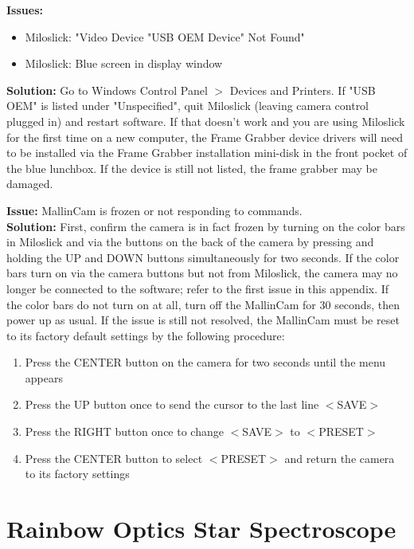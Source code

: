 \documentclass[12pt,titlepage]{article}
\begin{document}
\textbf{\flushleft Issues:}
\begin{itemize}
	\item Miloslick: "Video Device "USB OEM Device" Not Found"
	\item Miloslick: Blue screen in display window
\end{itemize}
\textbf{Solution:} Go to Windows Control Panel $>$ Devices and Printers.
If "USB OEM" is listed under "Unspecified", quit Miloslick (leaving camera control plugged in) and restart software.
If that doesn't work and you are using Miloslick for the first time on a new computer, the Frame Grabber device drivers will need to be installed via the Frame Grabber installation mini-disk in the front pocket of the blue lunchbox. If the device is still not listed, the frame grabber may be damaged.

\textbf{\flushleft Issue:} MallinCam is frozen or not responding to commands.\\
\textbf{Solution:} First, confirm the camera is in fact frozen by turning on the color bars in Miloslick and via the buttons on the back of the camera by pressing and holding the UP and DOWN buttons simultaneously for two seconds. If the color bars turn on via the camera buttons but not from Miloslick, the camera may no longer be connected to the software; refer to the first issue in this appendix. If the color bars do not turn on at all, turn off the MallinCam for 30 seconds, then power up as usual. If the issue is still not resolved, the MallinCam must be reset to its factory default settings by the following procedure:
\begin{enumerate}
	\item Press the CENTER button on the camera for two seconds until the menu appears
	\item Press the UP button once to send the cursor to the last line $<$SAVE$>$
	\item Press the RIGHT button once to change $<$SAVE$>$ to $<$PRESET$>$
	\item Press the CENTER button to select $<$PRESET$>$ and return the camera to its factory settings
\end{enumerate}




\section{Rainbow Optics Star Spectroscope}
\end{document}
